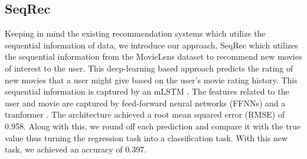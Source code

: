 \documentclass{bioinfo}
\begin{document}

\subsection{SeqRec}


Keeping in mind the existing recommendation systems which utilize the sequential information of data, we introduce our approach, SeqRec which utilizes the sequential information from the MovieLens dataset \citep{harper2015movielens} to recommend new movies of interest to the user. This deep-learning based approach predicts the rating of new movies that a user might give based on the user's movie rating history. This sequential information is captured by  an mLSTM \citep{krause2016multiplicative}. The features related to the user and movie are captured by feed-forward neural networks (FFNNs) and a tranformer \citep{vaswani2017attention}. The architecture achieved a root mean squared error (RMSE) of 0.958. Along with this, we round off each prediction and compare it with the true value thus turning the regression task into a classification task. With this new task, we achieved an accuracy of 0.397.  
\end{document}
